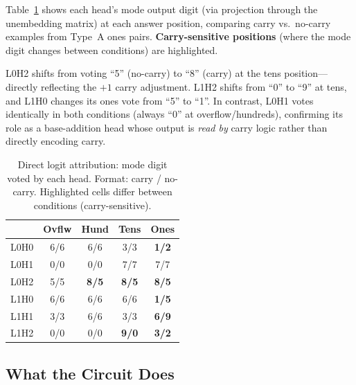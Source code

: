 \documentclass{article}
\begin{document}
Table~\ref{tab:logit_attr} shows each head's mode output digit (via projection through the unembedding matrix) at each answer position, comparing carry vs.\ no-carry examples from Type~A ones pairs.
\textbf{Carry-sensitive positions} (where the mode digit changes between conditions) are highlighted.

L0H2 shifts from voting ``5'' (no-carry) to ``8'' (carry) at the tens position---directly reflecting the $+1$ carry adjustment.
L1H2 shifts from ``0'' to ``9'' at tens, and L1H0 changes its ones vote from ``5'' to ``1''.
In contrast, L0H1 votes identically in both conditions (always ``0'' at overflow/hundreds), confirming its role as a base-addition head whose output is \emph{read by} carry logic rather than directly encoding carry.

\begin{table}[t]
\caption{Direct logit attribution: mode digit voted by each head. Format: carry / no-carry. \colorbox{yellow!30}{Highlighted} cells differ between conditions (carry-sensitive).}
\label{tab:logit_attr}
\centering
\small
\setlength{\tabcolsep}{3pt}
\begin{tabular}{lcccc}
\toprule
& \textbf{Ovflw} & \textbf{Hund} & \textbf{Tens} & \textbf{Ones} \\
\midrule
L0H0 & 6/6 & 6/6 & 3/3 & \cellcolor{yellow!30}\textbf{1/2} \\
L0H1 & 0/0 & 0/0 & 7/7 & 7/7 \\
L0H2 & 5/5 & \cellcolor{yellow!30}\textbf{8/5} & \cellcolor{yellow!30}\textbf{8/5} & \cellcolor{yellow!30}\textbf{8/5} \\
L1H0 & 6/6 & 6/6 & 6/6 & \cellcolor{yellow!30}\textbf{1/5} \\
L1H1 & 3/3 & 6/6 & 3/3 & \cellcolor{yellow!30}\textbf{6/9} \\
L1H2 & 0/0 & 0/0 & \cellcolor{yellow!30}\textbf{9/0} & \cellcolor{yellow!30}\textbf{3/2} \\
\bottomrule
\end{tabular}
\end{table}

\subsection{What the Circuit Does}
\label{sec:mechanism}
\end{document}
